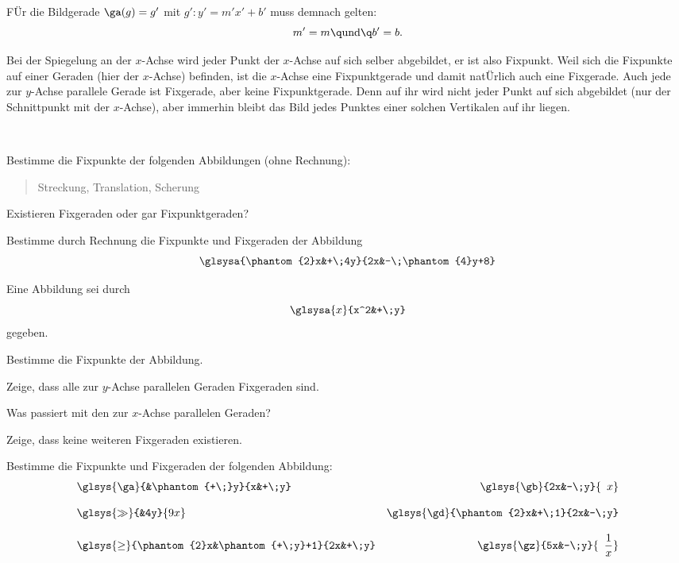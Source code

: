 \documentclass[%
11pt,%
twoside,%
titlepage,%
german,%
headsepline%
]{scrartcl}
\begin{document}
F\"Ur die Bildgerade $\ga(g)=g'$ mit $g' : y' = m'x' + b'$ muss demnach gelten:
$$m'=m\q\text{und}\q b'=b.$$

\begin{bsp}
Bei der Spiegelung an der $x$-Achse wird jeder Punkt der $x$-Achse auf sich selber abgebildet, er ist also Fixpunkt. Weil sich die Fixpunkte auf einer Geraden (hier der $x$-Achse) befinden, ist die $x$-Achse eine Fixpunktgerade und damit nat\"Urlich auch eine Fixgerade. Auch jede zur $y$-Achse parallele Gerade ist Fixgerade, aber keine Fixpunktgerade. Denn auf ihr wird nicht jeder Punkt auf sich abgebildet (nur der Schnittpunkt mit der $x$-Achse), aber immerhin bleibt das Bild jedes Punktes einer solchen Vertikalen auf ihr liegen.
\end{bsp}

\begin{ueb}
\ \\[-4ex]
\begin{enumeratea}
\item Bestimme die Fixpunkte der folgenden Abbildungen (ohne Rechnung):
\begin{quote}
Streckung, Translation, Scherung
\end{quote}
Existieren Fixgeraden oder gar Fixpunktgeraden?
\item Bestimme durch Rechnung die Fixpunkte und Fixgeraden der Abbildung
$$\glsysa{\phantom{2}x&+\;4y}{2x&-\;\phantom{4}y+8}$$
\item Eine Abbildung sei durch
$$\glsysa{x}{x^2&+\;y}$$
gegeben.
\begin{enumeratei}
\item Bestimme die Fixpunkte der Abbildung.
\item Zeige, dass alle zur $y$-Achse parallelen Geraden Fixgeraden sind.
\item Was passiert mit den zur $x$-Achse parallelen Geraden?
\item Zeige, dass keine weiteren Fixgeraden existieren.
\end{enumeratei}
\end{enumeratea}
\end{ueb}

\begin{ueb}
Bestimme die Fixpunkte und Fixgeraden der folgenden Abbildung:
\begin{align*}
&\glsys{\ga}{&\phantom{+\;}y}{x&+\;y}&\glsys{\gb}{2x&-\;y}{\phantom{2}x}\\[2ex]
&\glsys{\gg}{&4y}{9x}&\glsys{\gd}{\phantom{2}x&+\;1}{2x&-\;y}\\[2ex]
&\glsys{\ge}{\phantom{2}x&\phantom{+\;y}+1}{2x&+\;y}&\glsys{\gz}{5x&-\;y}{\phantom{5}\frac{1}{x}}
\end{align*}
\end{ueb}
\end{document}
